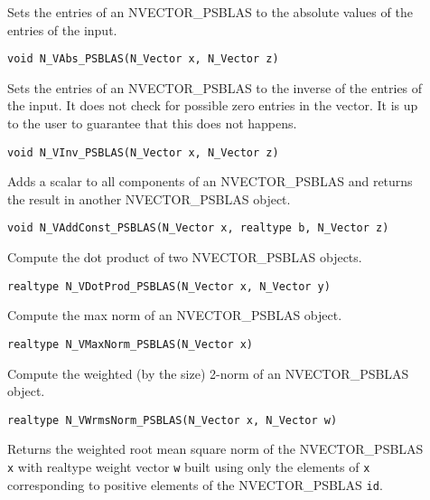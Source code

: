 \documentclass[twoside,a4paper]{refart}
\begin{document}
\begin{description}
 	\item[] Sets the entries of an NVECTOR\_PSBLAS to the absolute values of the entries of the input.
 	
 	 \lstinline[style=CStyle]|void N_VAbs_PSBLAS(N_Vector x, N_Vector z)|
 	
 	\item[] Sets the entries of an NVECTOR\_PSBLAS to the inverse of the entries of the input. It does not check for possible zero entries in the vector. It is up to the user to guarantee that this does not happens.
 	
 	 \lstinline[style=CStyle]|void N_VInv_PSBLAS(N_Vector x, N_Vector z)|
 	
 	\item[] Adds a scalar to all components of an NVECTOR\_PSBLAS and returns the result in another NVECTOR\_PSBLAS object.
 	 	
 	 \lstinline[style=CStyle]|void N_VAddConst_PSBLAS(N_Vector x, realtype b, N_Vector z)|
 	
 	\item[] Compute the dot product of two NVECTOR\_PSBLAS objects.
 	
 	 \lstinline[style=CStyle]|realtype N_VDotProd_PSBLAS(N_Vector x, N_Vector y)|
 	
 	\item[] Compute the max norm of an NVECTOR\_PSBLAS object.
 	
 	 \lstinline[style=CStyle]|realtype N_VMaxNorm_PSBLAS(N_Vector x)|
 	
 	\item[] Compute the weighted (by the size) 2-norm of an NVECTOR\_PSBLAS object.
 	
 	 \lstinline[style=CStyle]|realtype N_VWrmsNorm_PSBLAS(N_Vector x, N_Vector w)|
 	
 	\item[] Returns the weighted root mean square norm of the NVECTOR\_PSBLAS \lstinline[style=CStyle]|x| with
 	realtype weight vector \lstinline[style=CStyle]|w| built using only the elements of \lstinline[style=CStyle]|x| corresponding
 	to positive elements of the NVECTOR\_PSBLAS \lstinline[style=CStyle]|id|.
 	

\end{description}
\end{document}
